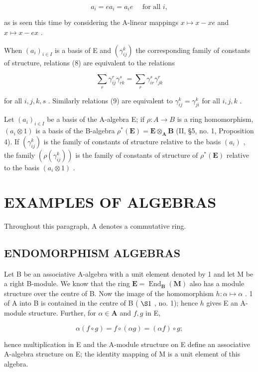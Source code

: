 \[
a _ {i} = e a _ {i} = a _ {i} e \quad \text { for   all } i,\tag{10}
\]

as is seen this time by considering the A-linear mappings \(x \mapsto x - xe\) and \(x \mapsto x - ex\) .

When \((a_{i})_{i\in I}\) is a basis of E and \((\gamma_{ij}^{k})\) the corresponding family of constants of structure, relations (8) are equivalent to the relations

\[
\sum_ {r} \gamma_ {i j} ^ {r} \gamma_ {r k} ^ {s} = \sum_ {r} \gamma_ {i r} ^ {s} \gamma_ {j k} ^ {r}
\]

for all \(i, j, k, s\) . Similarly relations (9) are equivalent to \(\gamma_{ij}^{k} = \gamma_{ji}^{k}\) for all \(i, j, k\) .

Let \((a_{i})_{i\in I}\) be a basis of the A-algebra E; if \(\rho :A\to B\) is a ring homomorphism, \((a_{i}\otimes 1)\) is a basis of the B-algebra \(\rho^{*}(\mathbf{E}) = \mathbf{E}\otimes_{\mathbf{A}}\mathbf{B}\) (II, §5, no. 1, Proposition 4). If \((\gamma_{ij}^{k})\) is the family of constants of structure relative to the basis \((a_{i})\) , the family \((\rho (\gamma_{ij}^{k}))\) is the family of constants of structure of \(\rho^{*}(\mathbf{E})\) relative to the basis \((a_{i}\otimes 1)\) .

\section{EXAMPLES OF ALGEBRAS}

Throughout this paragraph, A denotes a commutative ring.

\subsection{ENDOMORPHISM ALGEBRAS}

Let B be an associative A-algebra with a unit element denoted by 1 and let M be a right B-module. We know that the ring \(\mathbf{E} = \operatorname{End}_{\mathbf{B}}(\mathbf{M})\) also has a module structure over the centre of B. Now the image of the homomorphism \(h: \alpha \mapsto \alpha\) . 1 of A into B is contained in the centre of B ( \(\S 1\) , no. 1); hence \(h\) gives E an A-module structure. Further, for \(\alpha \in \mathbf{A}\) and \(f, g\) in E,

\[
\alpha (f \circ g) = f \circ (\alpha g) = (\alpha f) \circ g;
\]

hence multiplication in E and the A-module structure on E define an associative A-algebra structure on E; the identity mapping of M is a unit element of this algebra.

